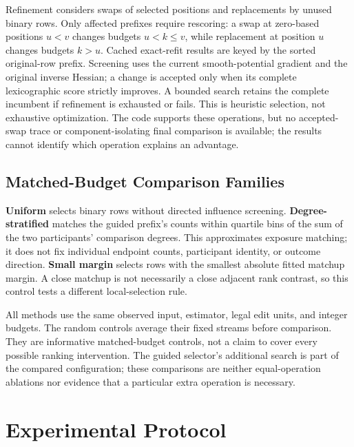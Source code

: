 \documentclass{article}
\begin{document}
Refinement considers swaps of selected positions and replacements by unused binary rows. Only affected prefixes require rescoring: a swap at zero-based positions $u<v$ changes budgets $u<k\le v$, while replacement at position $u$ changes budgets $k>u$. Cached exact-refit results are keyed by the sorted original-row prefix. Screening uses the current smooth-potential gradient and the original inverse Hessian; a change is accepted only when its complete lexicographic score strictly improves. A bounded search retains the complete incumbent if refinement is exhausted or fails. This is heuristic selection, not exhaustive optimization. The code supports these operations, but no accepted-swap trace or component-isolating final comparison is available; the results cannot identify which operation explains an advantage.

\subsection{Matched-Budget Comparison Families}
\textbf{Uniform} selects binary rows without directed influence screening. \textbf{Degree-stratified} matches the guided prefix's counts within quartile bins of the sum of the two participants' comparison degrees. This approximates exposure matching; it does not fix individual endpoint counts, participant identity, or outcome direction. \textbf{Small margin} selects rows with the smallest absolute fitted matchup margin. A close matchup is not necessarily a close adjacent rank contrast, so this control tests a different local-selection rule.

All methods use the same observed input, estimator, legal edit units, and integer budgets. The random controls average their fixed streams before comparison. They are informative matched-budget controls, not a claim to cover every possible ranking intervention. The guided selector's additional search is part of the compared configuration; these comparisons are neither equal-operation ablations nor evidence that a particular extra operation is necessary.

\section{Experimental Protocol}
\end{document}
